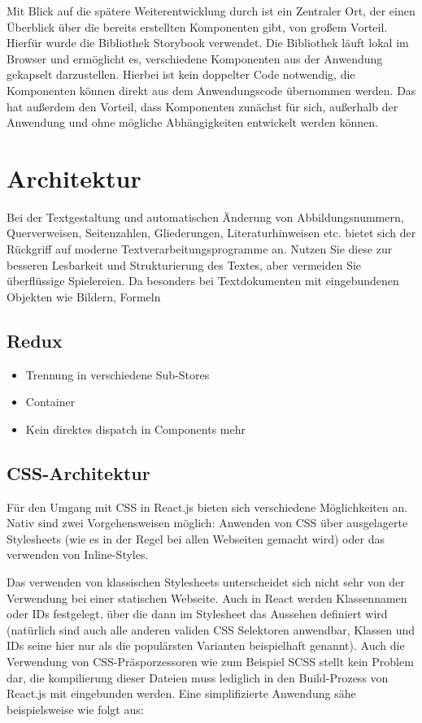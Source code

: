 Mit Blick auf die spätere Weiterentwicklung durch ist ein Zentraler Ort, der einen Überblick über die bereits erstellten Komponenten gibt, von großem Vorteil.
Hierfür wurde die Bibliothek Storybook\footnotemark{} verwendet. Die Bibliothek läuft lokal im Browser und ermöglicht es, verschiedene Komponenten aus der Anwendung gekapselt darzustellen. Hierbei ist kein doppelter Code notwendig, die Komponenten können direkt aus dem Anwendungscode übernommen werden.
Das hat außerdem den Vorteil, dass Komponenten zunächst für sich, außerhalb der Anwendung und ohne mögliche Abhängigkeiten entwickelt werden können.


\section{Architektur}
Bei der Textgestaltung und automatischen Änderung von Abbildungsnummern, Querverweisen,
Seitenzahlen, Gliederungen, Literaturhinweisen etc. bietet sich der Rückgriff
auf moderne Textverarbeitungsprogramme an. Nutzen Sie diese zur besseren Lesbarkeit
und Strukturierung des Textes, aber vermeiden Sie überflüssige Spielereien. Da
besonders bei Textdokumenten mit eingebundenen Objekten wie Bildern, Formeln

\subsection{Redux}
\begin{itemize}
  \item Trennung in verschiedene Sub-Stores
  \item Container
  \item Kein direktes dispatch in Components mehr
\end{itemize}


\subsection{CSS-Architektur}
Für den Umgang mit CSS in React.js bieten sich verschiedene Möglichkeiten an. Nativ sind zwei Vorgehensweisen möglich: Anwenden von CSS über ausgelagerte Stylesheets (wie es in der Regel bei allen Webseiten gemacht wird) oder das verwenden von Inline-Styles.

Das verwenden von klassischen Stylesheets unterscheidet sich nicht sehr von der Verwendung bei einer statischen Webseite. Auch in React werden Klassennamen oder IDs festgelegt, über die dann im Stylesheet das Aussehen definiert wird (natürlich sind auch alle anderen validen CSS Selektoren anwendbar, Klassen und IDs seine hier nur als die populärsten Varianten beispielhaft genannt).
Auch die Verwendung von CSS-Präsporzessoren wie zum Beispiel SCSS stellt kein Problem dar, die kompilierung dieser Dateien muss lediglich in den Build-Prozess von React.js mit eingebunden werden. Eine simplifizierte Anwendung sähe beispielsweise wie folgt aus:

